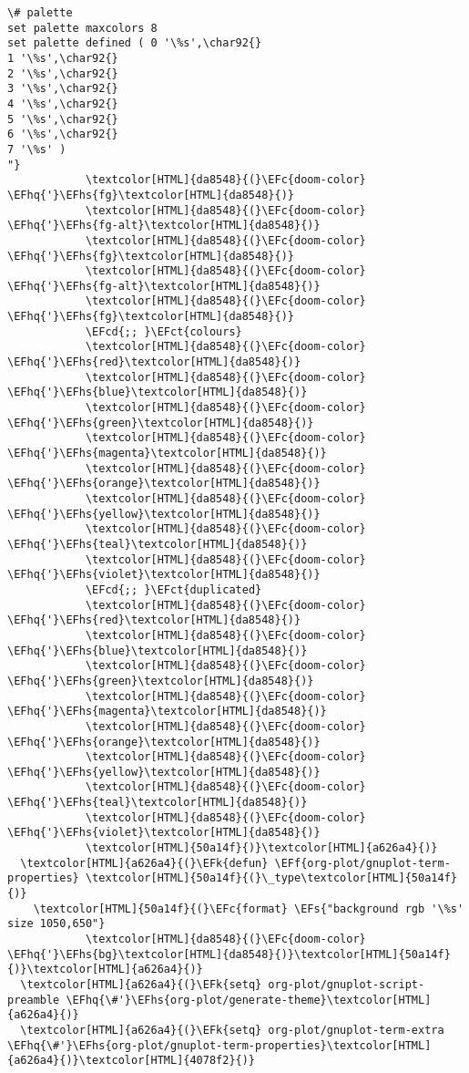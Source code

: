 \documentclass{scrartcl}
\newcommand{\EFk}[1]{\textcolor{EFk}{#1}} %
\newcommand{\EFs}[1]{\textcolor{EFs}{#1}} %
\newcommand{\EFct}[1]{\textcolor{EFct}{#1}} %
\newcommand{\EFc}[1]{\textcolor{EFc}{#1}} %
\newcommand{\EFf}[1]{\textcolor{EFf}{#1}} %
\newcommand{\EFcd}[1]{\textcolor{EFcd}{#1}} %
\newcommand{\EFhq}[1]{\textcolor{EFhq}{#1}} %
\newcommand{\EFhs}[1]{\textcolor{EFhs}{#1}} %
\begin{document}
\begin{Code}
\begin{Verbatim}[]
\# palette
set palette maxcolors 8
set palette defined ( 0 '\%s',\char92{}
1 '\%s',\char92{}
2 '\%s',\char92{}
3 '\%s',\char92{}
4 '\%s',\char92{}
5 '\%s',\char92{}
6 '\%s',\char92{}
7 '\%s' )
"}
            \textcolor[HTML]{da8548}{(}\EFc{doom-color} \EFhq{'}\EFhs{fg}\textcolor[HTML]{da8548}{)}
            \textcolor[HTML]{da8548}{(}\EFc{doom-color} \EFhq{'}\EFhs{fg-alt}\textcolor[HTML]{da8548}{)}
            \textcolor[HTML]{da8548}{(}\EFc{doom-color} \EFhq{'}\EFhs{fg}\textcolor[HTML]{da8548}{)}
            \textcolor[HTML]{da8548}{(}\EFc{doom-color} \EFhq{'}\EFhs{fg-alt}\textcolor[HTML]{da8548}{)}
            \textcolor[HTML]{da8548}{(}\EFc{doom-color} \EFhq{'}\EFhs{fg}\textcolor[HTML]{da8548}{)}
            \EFcd{;; }\EFct{colours}
            \textcolor[HTML]{da8548}{(}\EFc{doom-color} \EFhq{'}\EFhs{red}\textcolor[HTML]{da8548}{)}
            \textcolor[HTML]{da8548}{(}\EFc{doom-color} \EFhq{'}\EFhs{blue}\textcolor[HTML]{da8548}{)}
            \textcolor[HTML]{da8548}{(}\EFc{doom-color} \EFhq{'}\EFhs{green}\textcolor[HTML]{da8548}{)}
            \textcolor[HTML]{da8548}{(}\EFc{doom-color} \EFhq{'}\EFhs{magenta}\textcolor[HTML]{da8548}{)}
            \textcolor[HTML]{da8548}{(}\EFc{doom-color} \EFhq{'}\EFhs{orange}\textcolor[HTML]{da8548}{)}
            \textcolor[HTML]{da8548}{(}\EFc{doom-color} \EFhq{'}\EFhs{yellow}\textcolor[HTML]{da8548}{)}
            \textcolor[HTML]{da8548}{(}\EFc{doom-color} \EFhq{'}\EFhs{teal}\textcolor[HTML]{da8548}{)}
            \textcolor[HTML]{da8548}{(}\EFc{doom-color} \EFhq{'}\EFhs{violet}\textcolor[HTML]{da8548}{)}
            \EFcd{;; }\EFct{duplicated}
            \textcolor[HTML]{da8548}{(}\EFc{doom-color} \EFhq{'}\EFhs{red}\textcolor[HTML]{da8548}{)}
            \textcolor[HTML]{da8548}{(}\EFc{doom-color} \EFhq{'}\EFhs{blue}\textcolor[HTML]{da8548}{)}
            \textcolor[HTML]{da8548}{(}\EFc{doom-color} \EFhq{'}\EFhs{green}\textcolor[HTML]{da8548}{)}
            \textcolor[HTML]{da8548}{(}\EFc{doom-color} \EFhq{'}\EFhs{magenta}\textcolor[HTML]{da8548}{)}
            \textcolor[HTML]{da8548}{(}\EFc{doom-color} \EFhq{'}\EFhs{orange}\textcolor[HTML]{da8548}{)}
            \textcolor[HTML]{da8548}{(}\EFc{doom-color} \EFhq{'}\EFhs{yellow}\textcolor[HTML]{da8548}{)}
            \textcolor[HTML]{da8548}{(}\EFc{doom-color} \EFhq{'}\EFhs{teal}\textcolor[HTML]{da8548}{)}
            \textcolor[HTML]{da8548}{(}\EFc{doom-color} \EFhq{'}\EFhs{violet}\textcolor[HTML]{da8548}{)}
            \textcolor[HTML]{50a14f}{)}\textcolor[HTML]{a626a4}{)}
  \textcolor[HTML]{a626a4}{(}\EFk{defun} \EFf{org-plot/gnuplot-term-properties} \textcolor[HTML]{50a14f}{(}\_type\textcolor[HTML]{50a14f}{)}
    \textcolor[HTML]{50a14f}{(}\EFc{format} \EFs{"background rgb '\%s' size 1050,650"}
            \textcolor[HTML]{da8548}{(}\EFc{doom-color} \EFhq{'}\EFhs{bg}\textcolor[HTML]{da8548}{)}\textcolor[HTML]{50a14f}{)}\textcolor[HTML]{a626a4}{)}
  \textcolor[HTML]{a626a4}{(}\EFk{setq} org-plot/gnuplot-script-preamble \EFhq{\#'}\EFhs{org-plot/generate-theme}\textcolor[HTML]{a626a4}{)}
  \textcolor[HTML]{a626a4}{(}\EFk{setq} org-plot/gnuplot-term-extra \EFhq{\#'}\EFhs{org-plot/gnuplot-term-properties}\textcolor[HTML]{a626a4}{)}\textcolor[HTML]{4078f2}{)}
\end{Verbatim}
\end{Code}
\end{document}
